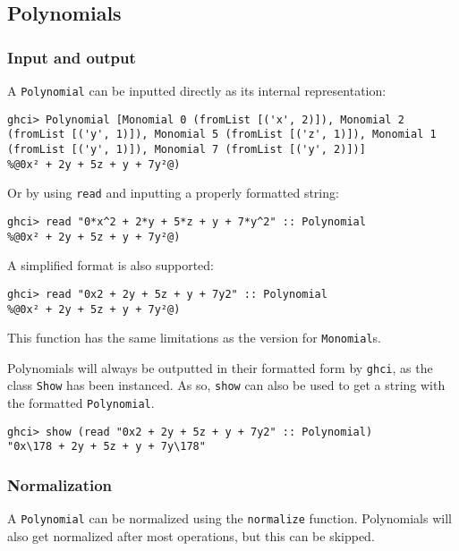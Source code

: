 \documentclass[11pt,a4paper]{article}
\begin{document}
\subsection{Polynomials}

\subsubsection{Input and output}

A \lstinline{Polynomial} can be inputted directly as its internal representation:

\begin{lstlisting}
ghci> Polynomial [Monomial 0 (fromList [('x', 2)]), Monomial 2 (fromList [('y', 1)]), Monomial 5 (fromList [('z', 1)]), Monomial 1 (fromList [('y', 1)]), Monomial 7 (fromList [('y', 2)])]
%@0x² + 2y + 5z + y + 7y²@)
\end{lstlisting}

Or by using \lstinline{read} and inputting a properly formatted string:

\begin{lstlisting}
ghci> read "0*x^2 + 2*y + 5*z + y + 7*y^2" :: Polynomial
%@0x² + 2y + 5z + y + 7y²@)
\end{lstlisting}

A simplified format is also supported:

\begin{lstlisting}
ghci> read "0x2 + 2y + 5z + y + 7y2" :: Polynomial
%@0x² + 2y + 5z + y + 7y²@)
\end{lstlisting}

This function has the same limitations as the version for \lstinline{Monomial}s.

\vspace{3mm}

Polynomials will always be outputted in their formatted form by \lstinline{ghci}, as the class \lstinline{Show} has been instanced.
As so, \lstinline{show} can also be used to get a string with the formatted \lstinline{Polynomial}.

\begin{lstlisting}
ghci> show (read "0x2 + 2y + 5z + y + 7y2" :: Polynomial)
"0x\178 + 2y + 5z + y + 7y\178"
\end{lstlisting}

\subsubsection{Normalization}

A \lstinline{Polynomial} can be normalized using the \lstinline{normalize} function.
Polynomials will also get normalized after most operations, but this can be skipped.
\end{document}
